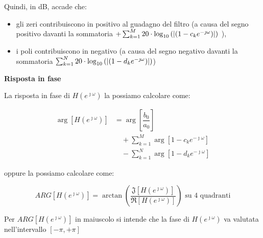 Quindi, in dB, accade che: 

\begin{itemize}
    \item gli zeri contribuiscono in positivo al guadagno del filtro (a causa del segno positivo davanti la sommatoria $+ \sum_{k = 1}^{M} 20 \cdot \log_{10} \left(  \abs{\left( 1 - c_k e^{-\jmath \omega}\right)} \right)$ ), 
    \item i poli contribuiscono in negativo (a causa del segno negativo davanti la sommatoria $\sum_{k = 1}^{N} 20 \cdot \log_{10} \left(  \abs{\left( 1 - d_k e^{-\jmath \omega}\right)} \right)$)
\end{itemize} 

\newpage 

\textbf{Risposta in fase} \newline 

La risposta in fase di $H \left(e^{\jmath \omega}\right)$ la possiamo calcolare come: 

{
    \Large 
    \begin{equation}
        \begin{split}
        \arg \left[ H \left( e^{\jmath \omega}\right)\right]
        &= 
        \arg
        \left[ \dfrac{b_0}{a_0} \right]
        \\
        &\quad
        +
        \sum_{k = 1}^{M}
        \arg
        \left[  1 - c_k e^{-\jmath \omega} \right]
        \\
        &\quad
        -
        \sum_{k = 1}^{N}
        \arg
        \left[ 1 - d_k e^{-\jmath \omega} \right] 
        \end{split}
    \end{equation}
}

oppure la possiamo calcolare come: 

{
    \Large 
    \begin{equation}
        ARG \left[ H \left( e^{\jmath \omega}\right)\right] 
        = 
        \arctan \left( \dfrac{\mathfrak{J} \left[ H \left( e^{\jmath \omega}\right)\right]}{\Re \left[ H \left( e^{\jmath \omega}\right)\right]}\right) 
        \text{ su 4 quadranti}
    \end{equation}
}

\begin{tcolorbox}
    Per $ARG \left[ H \left( e^{\jmath \omega}\right)\right]$ in maiuscolo si intende che la fase di $H \left( e^{\jmath \omega}\right)$ va valutata nell'intervallo $\left[ - \pi, + \pi\right]$
\end{tcolorbox}

